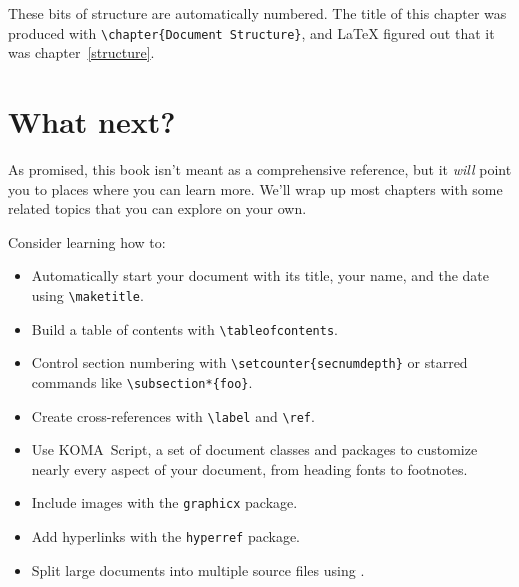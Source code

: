 These bits of structure are automatically numbered.
The title of this chapter was produced with \verb|\chapter{Document Structure}|,
and \LaTeX{} figured out that it was chapter~\ref{structure}.

\section{What next?}

As promised, this book isn't meant as a comprehensive reference,
but it \emph{will} point you to places where you can learn more.
We'll wrap up most chapters with some related topics that you can
explore on your own.

Consider learning how to:
\begin{itemize}
\item Automatically start your document with its title, your name,
    and the date using \verb|\maketitle|.
\item Build a table of contents
    with \verb|\tableofcontents|.
\item Control section numbering with \verb|\setcounter{secnumdepth}|
or starred commands like \verb|\subsection*{foo}|.
\item Create cross-references with \verb|\label| and \verb|\ref|.
\item Use KOMA~Script, a set of document classes and packages
to customize nearly every aspect of your document,
from heading fonts to footnotes.
\item Include images with the \texttt{graphicx} package.
\item Add hyperlinks with the \texttt{hyperref} package.
\item Split large documents into multiple source files using \verb||.
\end{itemize}
